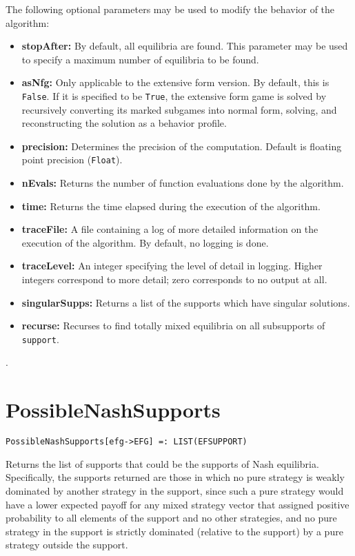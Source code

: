 \noindent
The following optional parameters may be used to modify the behavior
of the algorithm:
\begin{itemize}
\item
\textbf{stopAfter:} By default, all equilibria are found.  This parameter may
be used to specify a maximum number of equilibria to be found.
\item
\textbf{asNfg:} Only applicable to the extensive form version.  By default,
this is \verb+False+.  If it is specified to be \verb+True+, the
extensive form game is solved by recursively converting its marked
subgames into normal form, solving, and reconstructing the solution as
a behavior profile.
\item
\textbf{precision:} Determines the precision of the computation. Default is
floating point precision (\verb+Float+). 
\item
\textbf{nEvals:} Returns the number of function evaluations done by the
algorithm.
\item
\textbf{time:} Returns the time elapsed during the execution
of the algorithm.
\item
\textbf{traceFile:} A file containing a log of more detailed information on the
execution of the algorithm.  By default, no logging is done.
\item
\textbf{traceLevel:} An integer specifying the level of detail in logging.
Higher integers correspond to more detail; zero corresponds to no output
at all.
\item
\textbf{singularSupps:} Returns a list of the supports which have singular solutions. 
\item
\textbf{recurse:} Recurses to find totally mixed equilibria on all
subsupports of \verb+support+.
\end{itemize}

\seealso {}.


\section*{PossibleNashSupports}\label{PrimPossibleNashSupports}
\begin{verbatim}
PossibleNashSupports[efg->EFG] =: LIST(EFSUPPORT) 
\end{verbatim}

\noindent
Returns the list of supports that could be the supports of Nash
equilibria.  Specifically, the supports returned are those in which no
pure strategy is weakly dominated by another strategy in the support,
since such a pure strategy would have a lower expected payoff for any
mixed strategy vector that assigned positive probability to all
elements of the support and no other strategies, and no pure strategy
in the support is strictly dominated (relative to the support) by a
pure strategy outside the support.

